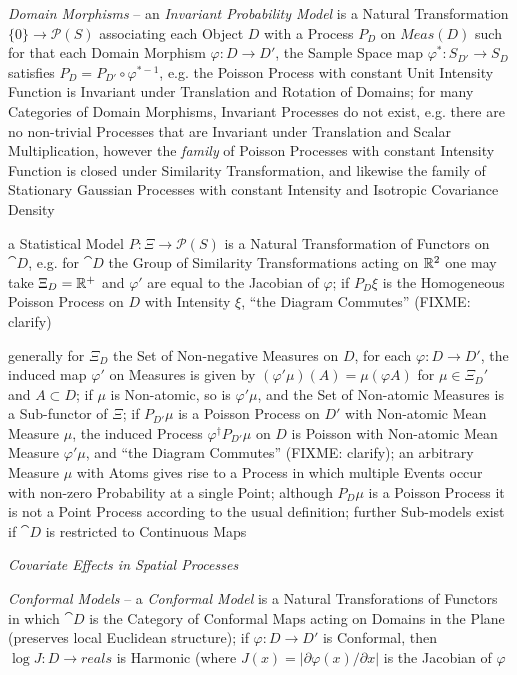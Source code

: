 \emph{Domain Morphisms} -- an \emph{Invariant Probability Model} is a Natural
Transformation $\{0\} \to \mathcal{P}(S)$ associating each Object $D$ with a
Process $P_D$ on $Meas(D)$ such for that each Domain Morphism
$\varphi : D \to D'$, the Sample Space map $\varphi^* : S_{D'} \to S_D$
satisfies $P_D = P_{D'} \circ \varphi^{*-1}$, e.g. the Poisson Process with
constant Unit Intensity Function is Invariant under Translation and Rotation of
Domains; for many Categories of Domain Morphisms, Invariant Processes do not
exist, e.g. there are no non-trivial Processes that are Invariant under
Translation and Scalar Multiplication, however the \emph{family} of Poisson
Processes with constant Intensity Function is closed under Similarity
Transformation, and likewise the family of Stationary Gaussian Processes with
constant Intensity and Isotropic Covariance Density

a Statistical Model $P : \Xi \to \mathcal{P}(S)$ is a Natural Transformation of
Functors on $\cat{D}$, e.g. for $\cat{D}$ the Group of Similarity
Transformations acting on $\mathbb{R}^2$ one may take $\Xi_D = \mathbb{R}^+$ and
$\varphi'$ are equal to the Jacobian of $\varphi$; if $P_D \xi$ is the
Homogeneous Poisson Process on $D$ with Intensity $\xi$, ``the Diagram
Commutes'' (FIXME: clarify)

generally for $\Xi_D$ the Set of Non-negative Measures on $D$, for each
$\varphi : D \to D'$, the induced map $\varphi'$ on Measures is given by
$(\varphi' \mu)(A) = \mu(\varphi A)$ for $\mu \in \Xi_D'$ and $A \subset D$; if
$\mu$ is Non-atomic, so is $\varphi' \mu$, and the Set of Non-atomic Measures is
a Sub-functor of $\Xi$; if $P_{D'}\mu$ is a Poisson Process on $D'$ with
Non-atomic Mean Measure $\mu$, the induced Process
$\varphi^\dagger P_{D'}\mu$ on $D$ is Poisson with Non-atomic Mean Measure
$\varphi'\mu$, and ``the Diagram Commutes'' (FIXME: clarify); an arbitrary
Measure $\mu$ with Atoms gives rise to a Process in which multiple Events occur
with non-zero Probability at a single Point; although $P_D\mu$ is a Poisson
Process it is not a Point Process according to the usual definition; further
Sub-models exist if $\cat{D}$ is restricted to Continuous Maps

\emph{Covariate Effects in Spatial Processes}

\emph{Conformal Models} -- a \emph{Conformal Model} is a Natural Transforations
of Functors in which $\cat{D}$ is the Category of Conformal Maps acting on
Domains in the Plane (preserves local Euclidean structure); if
$\varphi : D \to D'$ is Conformal, then $\log J : D \to reals$ is Harmonic
(where $J(x) = |\partial\varphi(x) / \partial x|$ is the Jacobian of $\varphi$

